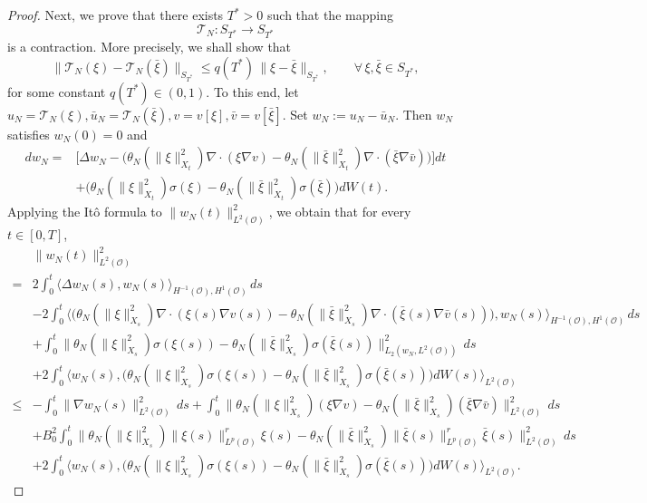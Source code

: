 \documentclass[reqno, 11pt]{amsart}
\theoremstyle{definition}
\numberwithin{equation}{section} \numberwithin{lem}{section}
\numberwithin{thm}{section} \numberwithin{prop}{section}
\numberwithin{cor}{section} \numberwithin{rem}{section}
\numberwithin{defn}{section}
\begin{document}
\begin{proof}
Next, we prove that there exists $T^*>0$ such that the mapping
\[
\mathcal T_N:S_{T^*}\to S_{T^*}
\]
is a contraction. More precisely, we shall show that
\[
\|\mathcal T_N(\xi)-\mathcal T_N(\bar\xi)\|_{S_{T^*}}
\le q(T^*)\,\|\xi-\bar\xi\|_{S_{T^*}},
\qquad \forall\,\xi,\bar\xi\in S_{T^*},
\]
for some constant $q(T^*)\in(0,1)$.
To this end, let $u_N=\mathcal T_N(\xi), \bar u_N=\mathcal T_N(\bar\xi), v=v[\xi], \bar v=v[\bar\xi].$
Set $w_N:=u_N-\bar u_N$. Then $w_N$ satisfies $w_N(0)=0$ and
    \begin{align*}
       dw_N=&\Big[\Delta {w_N}-\Big(\theta_N(\|\xi\|_{X_t}^2)\nabla\cdot(\xi\nabla v)-\theta_N(\|\bar \xi\|_{X_t}^2)\nabla\cdot(\bar \xi\nabla \bar v)\Big)\Big]dt\\&+\Big(\theta_N(\|\xi\|_{X_t}^2)\sigma(\xi)-\theta_N(\|\bar \xi\|_{X_t}^2)\sigma(\bar \xi )\Big)dW(t).
    \end{align*}
    Applying the It\^o formula to $\|{w_N}(t)\|_{L^2(\mathcal {O})}^2$,   we obtain that for every  $t\in[0,T]$,
    \begin{align}\label{U_1}
    \nonumber&\|{w_N}(t)\|_{L^2(\mathcal {O})}^2\\\nonumber
    =&2\int_0^t\big\langle \Delta {w_N}(s),{w_N}(s)\big\rangle_{{H^{-1}(\mathcal {O})},{H^1(\mathcal {O})}}\,ds\\\nonumber &-2\int_0^t\big\langle\big(\theta_N(\|\xi\|_{X_s}^2)\nabla\cdot(\xi(s)\nabla v(s))-\theta_N(\|\bar \xi\|_{X_s}^2)\nabla\cdot(\bar \xi(s)\nabla \bar v(s))\big),{w_N}(s)\big\rangle_{{H^{-1}(\mathcal {O})},{H^1(\mathcal {O})}}\,ds\\\nonumber &+\int_0^t\|\theta_N(\|\xi\|_{X_s}^2)\sigma(\xi(s))-\theta_N(\|\bar \xi\|_{X_s}^2)\sigma(\bar \xi(s) )\|_{L_2({w_N},L^2(\mathcal {O}))}^2 \,ds\\\nonumber&+2\int_0^t\big\langle {w_N}(s),\big(\theta_N(\|\xi\|_{X_s}^2)\sigma(\xi(s))-\theta_N(\|\bar \xi\|_{X_s}^2)\sigma(\bar \xi(s) )\big)dW(s)\big\rangle_{L^2(\mathcal {O})}\\\nonumber
    \le&-\int_0^t\|\nabla {w_N}(s)\|_{L^2(\mathcal {O})}^2\,ds+\int_0^t\|\theta_N(\|\xi\|_{X_s}^2)(\xi\nabla v)-\theta_N(\|\bar \xi\|_{X_s}^2)(\bar \xi\nabla \bar v)\|_{L^2(\mathcal {O})}^2\,ds\\&\nonumber +B_0^2\int_0^t
\big\|\theta_N(\|\xi\|_{X_s}^2)\|\xi(s)\|_{L^p(\mathcal O)}^r \xi(s)-\theta_N(\|\bar \xi\|_{X_s}^2)\|\bar \xi(s) \|_{L^p(\mathcal O)}^r \bar \xi(s)\big\|_{L^2(\mathcal O)}^2\,ds\\&+2\int_0^t\big\langle {w_N}(s),\big(\theta_N(\|\xi\|_{X_s}^2)\sigma(\xi(s))-\theta_N(\|\bar \xi\|_{X_s}^2)\sigma(\bar \xi(s) )\big)dW(s)\big\rangle_{L^2(\mathcal {O})}.

\end{align}
\end{proof}
\end{document}
